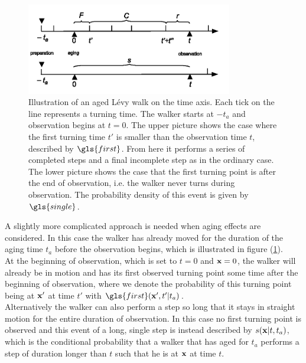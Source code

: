 \begin{figure}
\begin{center}
\includegraphics[width=90mm]{pics/pdfAged.png}
\caption{Illustration of an aged L\'evy walk on the time axis. Each tick on the line represents a turning time. The walker starts at $-t_a$ and observation begins at $t=0$.  The upper picture shows the case where the first turning time $t'$ is smaller than the observation time $t$, described by $\gls{first}$. From here it performs a series of completed steps and a final incomplete step as in the ordinary case. The lower picture shows the case that the first turning point is after the end of observation, i.e. the walker never turns during observation. The probability density of this event is given by $\gls{single}$.
\label{fig:pdfAged}}
\end{center}
\end{figure}

A slightly more complicated approach is needed when aging effects are considered. In this case the walker has already moved for the duration of the aging time $t_a$ before the observation begins, which is illustrated in figure (\ref{fig:pdfAged}). \\
At the beginning of observation, which is set to $t=0$ and $\mathbf{ x }=0$, the walker will already be in motion and has its first observed turning point some time after the beginning of observation, where we denote the probability of this turning point being at $\mathbf{ x' }$ at time $t'$ with $\gls{first}(\ve{x}',t'|t_a)$. \\
Alternatively the walker can also perform a step so long that it stays in straight motion for the entire duration of observation. In this case  no first turning point is observed and this event of a long, single step is instead described by $s(\mathbf{ x }|t,t_a)$, which is the conditional probability that a walker that has aged for $t_a$ performs a step of duration longer than $t$ such that he is at $\mathbf{ x }$ at time $t$. \\

